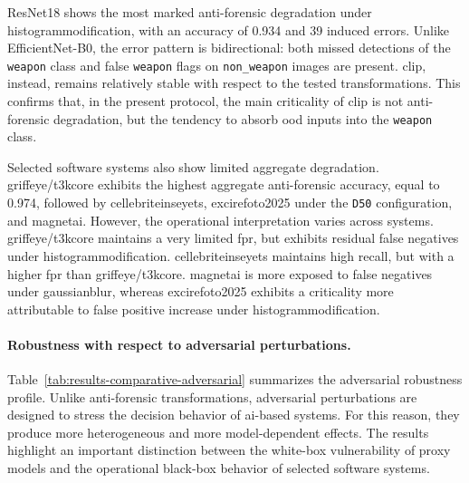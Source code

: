 ResNet18 shows the most marked anti-forensic degradation under
\gls{histogrammodification}, with an accuracy of 0.934 and 39 induced errors.
Unlike EfficientNet-B0, the error pattern is bidirectional: both missed
detections of the \texttt{weapon} class and false \texttt{weapon} flags on
\texttt{non\_weapon} images are present. \gls{clip}, instead, remains
relatively stable with respect to the tested transformations. This confirms
that, in the present protocol, the main criticality of \gls{clip} is not
anti-forensic degradation, but the tendency to absorb \gls{ood} inputs into the
\texttt{weapon} class.

Selected software systems also show limited aggregate degradation.
\gls{griffeye}/\gls{t3kcore} exhibits the highest aggregate anti-forensic
accuracy, equal to 0.974, followed by \gls{cellebriteinseyets},
\gls{excirefoto2025} under the \texttt{D50} configuration, and \gls{magnetai}.
However, the operational interpretation varies across systems.
\gls{griffeye}/\gls{t3kcore} maintains a very limited \gls{fpr}, but exhibits
residual false negatives under \gls{histogrammodification}.
\gls{cellebriteinseyets} maintains high recall, but with a higher \gls{fpr}
than \gls{griffeye}/\gls{t3kcore}. \gls{magnetai} is more exposed to false
negatives under \gls{gaussianblur}, whereas \gls{excirefoto2025} exhibits a
criticality more attributable to false positive increase under
\gls{histogrammodification}.

\paragraph{Robustness with respect to adversarial perturbations.}

Table~\ref{tab:results-comparative-adversarial} summarizes the adversarial
robustness profile. Unlike anti-forensic transformations, adversarial
perturbations are designed to stress the decision behavior of \gls{ai}-based
systems. For this reason, they produce more heterogeneous and more
model-dependent effects. The results highlight an important distinction between
the white-box vulnerability of proxy models and the operational black-box
behavior of selected software systems.

